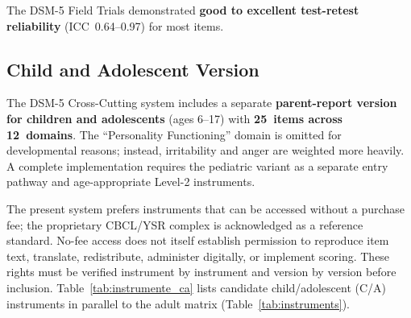 \documentclass[11pt,a4paper]{article}
\begin{document}
The DSM-5 Field Trials \citep{Narrow2013} demonstrated \textbf{good to excellent test-retest reliability} (ICC~0.64--0.97) for most items.

\subsection{Child and Adolescent Version}
\label{sec:screening_ca}

The DSM-5 Cross-Cutting system includes a separate \textbf{parent-report version for children and adolescents} (ages 6--17) with \textbf{25~items across 12~domains}. The ``Personality Functioning'' domain is omitted for developmental reasons; instead, irritability and anger are weighted more heavily. A complete implementation requires the pediatric variant as a separate entry pathway and age-appropriate Level-2 instruments.

The present system prefers instruments that can be accessed without a purchase fee; the proprietary CBCL/YSR complex \citep{Achenbach2001} is acknowledged as a reference standard. No-fee access does not itself establish permission to reproduce item text, translate, redistribute, administer digitally, or implement scoring. These rights must be verified instrument by instrument and version by version before inclusion. Table~\ref{tab:instrumente_ca} lists candidate child/adolescent (C/A) instruments in parallel to the adult matrix (Table~\ref{tab:instruments}).
\end{document}
